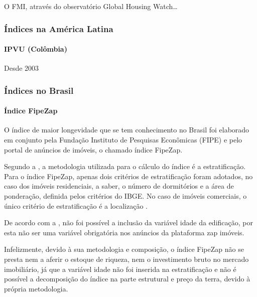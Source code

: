 \documentclass[
	12pt,				%
	oneside,			%
	a4paper,			%
	chapter=TITLE,		%
	section=TITLE,		%
	english,			%
	brazil				%
	]{abntex2}
\begin{document}
O FMI, através do observatório Global Housing Watch\ldots{}

\subsubsection{Índices na América
Latina}\label{uxedndices-na-amuxe9rica-latina}

\paragraph{IPVU (Colômbia)}\label{ipvu-coluxf4mbia}

Desde 2003 \autocite[130]{rppi}

\subsubsection{Índices no Brasil}\label{uxedndices-no-brasil}

\paragraph{Índice FipeZap}\label{uxedndice-fipezap}

O índice de maior longevidade que se tem conhecimento no Brasil foi
elaborado em conjunto pela Fundação Instituto de Pesquisas Econômicas
(FIPE) e pelo portal de anúncios de imóveis, o chamado índice FipeZap.

Segundo a \textcite{fipezap}, a metodologia utilizada para o cálculo do
índice é a estratificação. Para o índice FipeZap, apenas dois critérios
de estratificação foram adotados, no caso dos imóveis residenciais, a
saber, o número de dormitórios e a área de ponderação, definida pelos
critérios do IBGE. No caso de imóveis comerciais, o único critério de
estratificação é a localização \autocite[7]{fipezap}.

De acordo com a \textcite{fipezap}, não foi possível a inclusão da
variável idade da edificação, por esta não ser uma variável obrigatória
nos anúncios da plataforma zap imóveis.

Infelizmente, devido à sua metodologia e composição, o índice FipeZap
não se presta nem a aferir o estoque de riqueza, nem o investimento
bruto no mercado imobiliário, já que a variável idade não foi inserida
na estratificação e não é possível a decomposição do índice na parte
estrutural e preço da terra, devido à própria metodologia.
\end{document}

